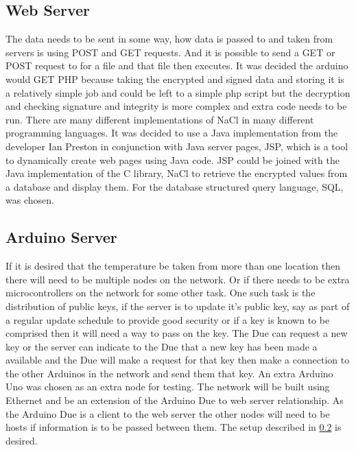 \subsection{Web Server}
The data needs to be sent in some way, how data is passed to and taken from servers is using POST and GET requests. And it is possible to send a GET or POST request to for a file and that file then executes. It was decided the arduino would GET PHP because taking the encrypted and signed data and storing it is a relatively simple job and could be left to a simple php script but the decryption and checking signature and integrity is more complex and extra code needs to be run. There are many different implementations of NaCl in many different programming languages. It was decided to use a Java implementation from the developer Ian Preston in conjunction with Java server pages, JSP, which is a tool to dynamically create web pages using Java code. JSP could be joined with the Java implementation of the C library, NaCl to retrieve the encrypted values from a database and display them. For the database structured query language, SQL, was chosen.

\subsection{Arduino Server}

If it is desired that the temperature be taken from more than one location then there will need to be multiple nodes on the network. Or if there needs to be extra microcontrollers on the network for some other task. One such task is the distribution of public keys, if the server is to update it's public key, say as part of a regular update schedule to provide good security or if a key is known to be comprised then it will need a way to pass on the key. The Due can request a new key or the server can indicate to the Due that a new key has been made a available and the Due will make a request for that key then make a connection to the other Arduinos in the network and send them that key. An extra Arduino Uno was chosen as an extra node for testing. The network will be built using Ethernet and be an extension of the Arduino Due to web server relationship. As the Arduino Due is a client to the web server the other nodes will need to be hosts if information is to be passed between them. The setup described in \ref{} is desired. 